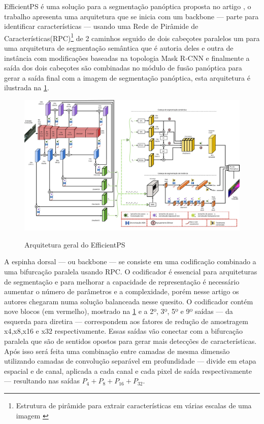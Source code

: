 \label{sec:EfficientPS}

EfficientPS é uma solução para a segmentação panóptica proposta no artigo , o trabalho apresenta uma arquitetura que se inicia com um backbone — parte para identificar características — usando uma Rede de Pirâmide de Características(RPC)\footnote{Estrutura de pirâmide para extrair características em várias escalas de uma imagem \space\cite{piramide}} de 2 caminhos seguido de dois cabeçotes paralelos um para uma arquitetura de segmentação semântica que é autoria deles e outra de instância com modificações baseadas na topologia Mask R-CNN e finalmente a saída dos dois cabeçotes são combinadas no módulo de fusão panóptica para gerar a saída final com a imagem de segmentação panóptica, esta arquitetura é ilustrada na \cref{fig:arqEP}.

\begin{figure}[ht]
	\caption{Arquitetura geral do EfficientPS}
	\centering %
	\includegraphics[width=15cm]{figures/arqEP.png} %
	\label{fig:arqEP}
\end{figure}


A espinha dorsal — ou backbone — se consiste em uma codificação combinado a uma bifurcação paralela usando RPC. O codificador é essencial para arquiteturas de segmentação e para melhorar a capacidade de representação é necessário aumentar o número de parâmetros e a complexidade, porém nesse artigo os autores chegaram numa solução balanceada nesse quesito. O codificador contém nove blocos (em vermelho), mostrado na \cref{fig:arqEP} e a 2º, 3º, 5º e 9º saídas — da esquerda para diretira — correspondem aos fatores de redução de amostragem x4,x8,x16 e x32 respectivamente. Essas saídas vão conectar com a bifurcação paralela que são de sentidos opostos para gerar mais detecções de características. Após isso será feita uma combinação entre camadas de mesma dimensão utilizando camadas de convolução separável em profundidade — divide em etapa espacial e de canal, aplicada a cada canal e cada pixel de saída respectivamente — resultando nas saídas $ P_4 + P_8 + P_{16} + P_{32} $\cite{mohan2020efficientps, redes-neurais-convolucionais-separaveis-em-profundidade}.


